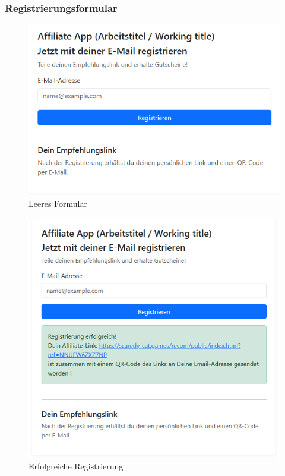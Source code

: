 \subsubsection{Registrierungsformular}
\begin{figure}[H]
    \centering
    \includegraphics[width=0.8\linewidth]{Bilder/screenshots/form_blank.png}
    \caption{Leeres Formular}
    \label{fig:placeholder}
\end{figure}

\begin{figure}[H]
    \centering
    \includegraphics[width=0.8\linewidth]{Bilder/screenshots/form_registered.png}
    \caption{Erfolgreiche Registrierung}
    \label{fig:placeholder}
\end{figure}

